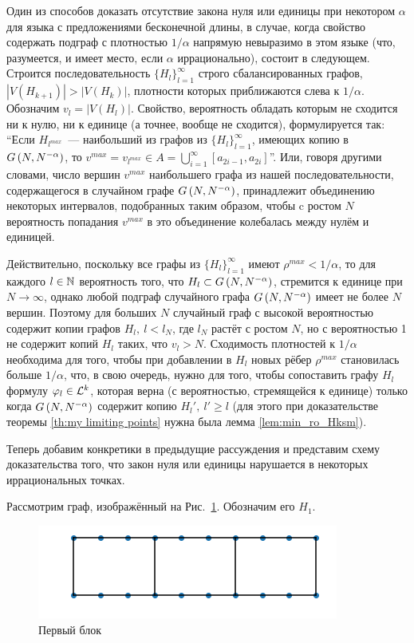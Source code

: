 Один из способов доказать отсутствие закона нуля  или единицы при некотором $\alpha$ для языка с предложениями бесконечной длины, в случае, когда свойство содержать подграф с плотностью $1/\alpha$ напрямую невыразимо в этом языке (что, разумеется, и имеет место, если $\alpha$ иррационально), состоит в следующем.
\def \seql {\{H_l\}_{l=1}^\infty}
Строится последовательность $\seql$ строго сбалансированных графов, $|V(H_{k+1})| > |V(H_{k})|$, плотности которых приближаются слева к $1/\alpha$.
Обозначим $v_l = |V(H_l)|$.
Свойство, вероятность обладать которым не сходится ни к нулю, ни к единице (а точнее, вообще не сходится), формулируется так: ``Если $H_{l^{max}}$~--- наибольший из графов из $\seql$, имеющих копию в $G\left(N,N^{-\alpha}\right)$, то $v^{max} = v_{l^{max}} \in A = \bigcup_{i=1}^\infty [a_{2i-1},a_{2i}]$''. Или, говоря другими словами, число  вершин $v^{max}$ наибольшего графа из нашей последовательности, содержащегося в случайном графе $G\left(N,N^{-\alpha}\right)$, принадлежит объединению некоторых интервалов, подобранных таким образом, чтобы c ростом $N$ вероятность попадания $v^{max}$ в это объединение колебалась между нулём и единицей.

Действительно, поскольку все графы из $\seql$ имеют $\rho^{max} < 1/\alpha$, то для каждого $l \in \mathbb {N}$ вероятность того, что $H_l \subset G\left(N,N^{-\alpha}\right)$, стремится  к единице при $N \rightarrow \infty$, однако любой подграф случайного графа $G\left(N,N^{-\alpha}\right)$ имеет не более $N$ вершин.
Поэтому для больших $N$ случайный граф с высокой вероятностью содержит копии графов $H_l,~ l < l_N$, где $l_N$ растёт с ростом $N$, но с вероятностью 1 не содержит копий $H_l$ таких, что $v_l > N$.
Сходимость плотностей к $1/\alpha$ необходима для того, чтобы при добавлении в $H_l$ новых рёбер $\rho^{max}$ становилась больше $1/\alpha$, что, в свою очередь, нужно для того, чтобы сопоставить графу $H_l$ формулу $\varphi_l \in \mathcal{L}^k$, которая верна (с вероятностью, стремящейся к единице) только когда $G\left(N,N^{-\alpha}\right)$ содержит копию $H_l',~ l' \geq l$ (для этого при доказательстве теоремы \ref{th:my limiting points} нужна была лемма \ref{lem:min_ro_Hksm}).

Теперь добавим конкретики в предыдущие рассуждения и представим схему доказательства того, что закон нуля или единицы нарушается в некоторых иррациональных точках.

Рассмотрим граф, изображённый на Рис.~\ref{fig:first block}. Обозначим его $H_1$.
\begin{figure}
  \centering
  \includegraphics[scale=0.5]{picrel/first_block.png}
  \caption{Первый блок}
  \label{fig:first block}
\end{figure}

